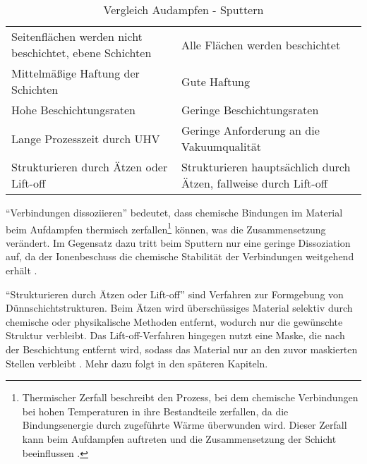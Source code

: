 \documentclass{article} %
\begin{document}
\begin{table}[htb!]
\begin{tabular}{|p{6cm}|p{6cm}|}
        Seitenflächen werden nicht beschichtet, ebene Schichten & Alle Flächen werden beschichtet \\
        Mittelmäßige Haftung der Schichten & Gute Haftung \\
        Hohe Beschichtungsraten & Geringe Beschichtungsraten \\
        Lange Prozesszeit durch UHV & Geringe Anforderung an die Vakuumqualität \\
        Strukturieren durch Ätzen oder Lift-oﬀ & Strukturieren hauptsächlich durch Ätzen, fallweise durch Lift-off \\ \hline
    \end{tabular}
    \captionsetup{labelfont=bf} %
    \caption{Vergleich Audampfen - Sputtern \cite{keplinger2024}}
    \label{tab:Vergleich Aufdampfen - Sputtern}
\end{table}

\vspace{1em} %

``Verbindungen dissoziieren'' bedeutet, dass chemische Bindungen im Material beim Aufdampfen thermisch zerfallen\footnote{Thermischer Zerfall beschreibt den Prozess, bei dem chemische Verbindungen bei hohen Temperaturen in ihre Bestandteile zerfallen, da die Bindungsenergie durch zugeführte Wärme überwunden wird. Dieser Zerfall kann beim Aufdampfen auftreten und die Zusammensetzung der Schicht beeinflussen \cite{ohring2002, smith1995}.} können, was die Zusammensetzung verändert. Im Gegensatz dazu tritt beim Sputtern nur eine geringe Dissoziation auf, da der Ionenbeschuss die chemische Stabilität der Verbindungen weitgehend erhält \cite{ohring2002, smith1995, rossnagel2003magnetron}.

\vspace{1em} %

``Strukturieren durch Ätzen oder Lift-off'' sind Verfahren zur Formgebung von Dünnschichtstrukturen. Beim Ätzen wird überschüssiges Material selektiv durch chemische oder physikalische Methoden entfernt, wodurch nur die gewünschte Struktur verbleibt. Das Lift-off-Verfahren hingegen nutzt eine Maske, die nach der Beschichtung entfernt wird, sodass das Material nur an den zuvor maskierten Stellen verbleibt \cite{ohring2002, smith1995, prechtl2005grundlagen}. Mehr dazu folgt in den späteren Kapiteln.



\end{document}

